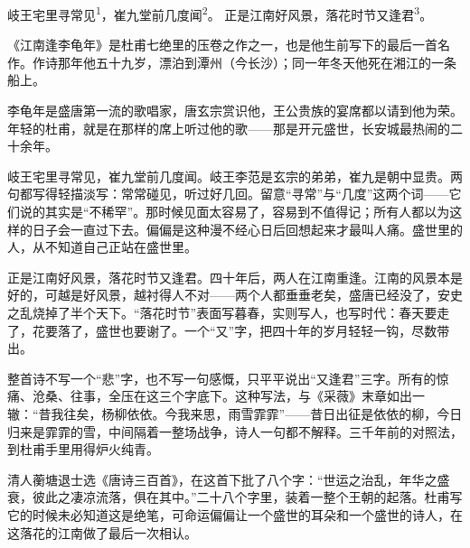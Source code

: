 
\begin{poem}
岐王宅里寻常见\textsuperscript{1}，崔九堂前几度闻\textsuperscript{2}。
正是江南好风景，落花时节又逢君\textsuperscript{3}。
\end{poem}

\begin{annotations}
\end{annotations}

\begin{appreciation}
《江南逢李龟年》是杜甫七绝里的压卷之作之一，也是他生前写下的最后一首名作。作诗那年他五十九岁，漂泊到潭州（今长沙）；同一年冬天他死在湘江的一条船上。

李龟年是盛唐第一流的歌唱家，唐玄宗赏识他，王公贵族的宴席都以请到他为荣。年轻的杜甫，就是在那样的席上听过他的歌——那是开元盛世，长安城最热闹的二十余年。

岐王宅里寻常见，崔九堂前几度闻。岐王李范是玄宗的弟弟，崔九是朝中显贵。两句都写得轻描淡写：常常碰见，听过好几回。留意“寻常”与“几度”这两个词——它们说的其实是“不稀罕”。那时候见面太容易了，容易到不值得记；所有人都以为这样的日子会一直过下去。偏偏是这种漫不经心日后回想起来才最叫人痛。盛世里的人，从不知道自己正站在盛世里。

正是江南好风景，落花时节又逢君。四十年后，两人在江南重逢。江南的风景本是好的，可越是好风景，越衬得人不对——两个人都垂垂老矣，盛唐已经没了，安史之乱烧掉了半个天下。“落花时节”表面写暮春，实则写人，也写时代：春天要走了，花要落了，盛世也要谢了。一个“又”字，把四十年的岁月轻轻一钩，尽数带出。

整首诗不写一个“悲”字，也不写一句感慨，只平平说出“又逢君”三字。所有的惊痛、沧桑、往事，全压在这三个字底下。这种写法，与《采薇》末章如出一辙：“昔我往矣，杨柳依依。今我来思，雨雪霏霏”——昔日出征是依依的柳，今日归来是霏霏的雪，中间隔着一整场战争，诗人一句都不解释。三千年前的对照法，到杜甫手里用得炉火纯青。

清人蘅塘退士选《唐诗三百首》，在这首下批了八个字：“世运之治乱，年华之盛衰，彼此之凄凉流落，俱在其中。”二十八个字里，装着一整个王朝的起落。杜甫写它的时候未必知道这是绝笔，可命运偏偏让一个盛世的耳朵和一个盛世的诗人，在这落花的江南做了最后一次相认。
\end{appreciation}
